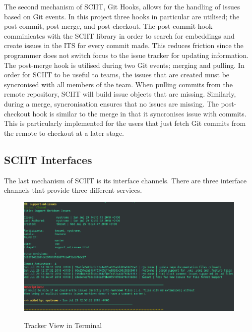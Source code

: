 \documentclass{mproj}
\begin{document}
The second mechanism of SCIIT, Git Hooks, allows for the handling of issues based on Git events. In this project three hooks in particular are utilised; the post-commit, post-merge, and post-checkout. The post-commit hook comminicates with the SCIIT library in order to search for embeddings and create issues in the ITS for every commit made. This reduces friction since the programmer does not switch focus to the issue tracker for updating information. The post-merge hook is utilised during two Git events; merging and pulling. In order for SCIIT to be useful to teams, the issues that are created must be syncronised with all members of the team. When pulling commits from the remote repository, SCIIT will build issue objects that are missing. Similarly, during a merge, syncronisation ensures that no issues are missing. The post-checkout hook is similar to the merge in that it syncronises issue with commits. This is particularly implemented for the users that just fetch Git commits from the remote to checkout at a later stage.

\subsection{SCIIT Interfaces}

The last mechanism of SCIIT is its interface channels. There are three interface channels that provide three different services. 

\begin{figure}
\centering
  \caption{Tracker View in Terminal}
  \includegraphics[width=15cm]{sciit-tracker-shot}
  \label{fig:sciit-tracker-shot}
\end{figure}
\end{document}
